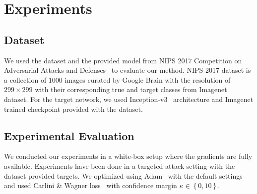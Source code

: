 \chapter{Experiments}
\label{chp:4_results}
\section{Dataset}

We used the dataset and the provided model from NIPS 2017 Competition on Adversarial Attacks and Defenses~\cite{kurakin2018adversarial} to evaluate our method. NIPS 2017 dataset is a collection of 1000 images curated by Google Brain with the resolution of \(299 \times 299\) with their corresponding true and target classes from Imagenet~\cite{deng2009imagenet} dataset. For the target network, we used Inception-v3~\cite{szegedy2016rethinking} architecture and Imagenet trained checkpoint provided with the dataset.
\section{Experimental Evaluation}
We conducted our experiments in a white-box setup where the gradients are fully available. Experiments have been done in a targeted attack setting with the dataset provided targets. We optimized using Adam~\cite{kingma2015adam} with the default settings and used Carlini \& Wagner loss~\cite{carlini2017towards} with confidence margin \(\kappa \in \left\{ 0, 10 \right\}\).



